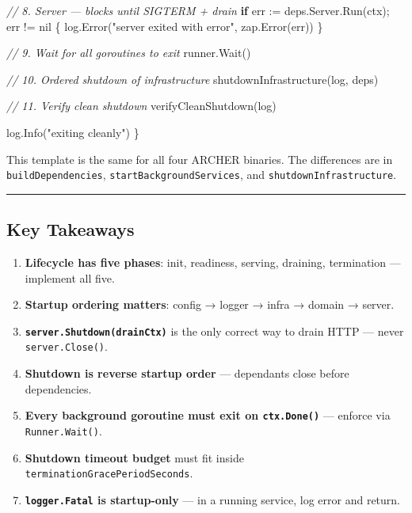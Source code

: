 \documentclass[
]{article}
\newenvironment{Shaded}{}{}
\newcommand{\CommentTok}[1]{\textcolor[rgb]{0.38,0.63,0.69}{\textit{#1}}}
\newcommand{\ControlFlowTok}[1]{\textcolor[rgb]{0.00,0.44,0.13}{\textbf{#1}}}
\newcommand{\NormalTok}[1]{#1}
\newcommand{\OperatorTok}[1]{\textcolor[rgb]{0.40,0.40,0.40}{#1}}
\newcommand{\OtherTok}[1]{\textcolor[rgb]{0.00,0.44,0.13}{#1}}
\newcommand{\StringTok}[1]{\textcolor[rgb]{0.25,0.44,0.63}{#1}}
\providecommand{\tightlist}{%
  \setlength{\itemsep}{0pt}\setlength{\parskip}{0pt}}
\begin{document}
\begin{Shaded}
\begin{Highlighting}[]
    \CommentTok{// 8. Server — blocks until SIGTERM + drain}
    \ControlFlowTok{if}\NormalTok{ err }\OperatorTok{:=}\NormalTok{ deps}\OperatorTok{.}\NormalTok{Server}\OperatorTok{.}\NormalTok{Run}\OperatorTok{(}\NormalTok{ctx}\OperatorTok{);}\NormalTok{ err }\OperatorTok{!=} \OtherTok{nil} \OperatorTok{\{}
\NormalTok{        log}\OperatorTok{.}\NormalTok{Error}\OperatorTok{(}\StringTok{"server exited with error"}\OperatorTok{,}\NormalTok{ zap}\OperatorTok{.}\NormalTok{Error}\OperatorTok{(}\NormalTok{err}\OperatorTok{))}
    \OperatorTok{\}}

    \CommentTok{// 9. Wait for all goroutines to exit}
\NormalTok{    runner}\OperatorTok{.}\NormalTok{Wait}\OperatorTok{()}

    \CommentTok{// 10. Ordered shutdown of infrastructure}
\NormalTok{    shutdownInfrastructure}\OperatorTok{(}\NormalTok{log}\OperatorTok{,}\NormalTok{ deps}\OperatorTok{)}

    \CommentTok{// 11. Verify clean shutdown}
\NormalTok{    verifyCleanShutdown}\OperatorTok{(}\NormalTok{log}\OperatorTok{)}

\NormalTok{    log}\OperatorTok{.}\NormalTok{Info}\OperatorTok{(}\StringTok{"exiting cleanly"}\OperatorTok{)}
\OperatorTok{\}}
\end{Highlighting}
\end{Shaded}

This template is the same for all four ARCHER binaries. The differences
are in \texttt{buildDependencies}, \texttt{startBackgroundServices}, and
\texttt{shutdownInfrastructure}.

\begin{center}\rule{0.5\linewidth}{0.5pt}\end{center}

\hypertarget{key-takeaways-2}{%
\subsection{Key Takeaways}\label{key-takeaways-2}}

\begin{enumerate}
\def\labelenumi{\arabic{enumi}.}
\tightlist
\item
  \textbf{Lifecycle has five phases}: init, readiness, serving,
  draining, termination --- implement all five.
\item
  \textbf{Startup ordering matters}: config → logger → infra → domain →
  server.
\item
  \textbf{\texttt{server.Shutdown(drainCtx)}} is the only correct way to
  drain HTTP --- never \texttt{server.Close()}.
\item
  \textbf{Shutdown is reverse startup order} --- dependants close before
  dependencies.
\item
  \textbf{Every background goroutine must exit on \texttt{ctx.Done()}}
  --- enforce via \texttt{Runner.Wait()}.
\item
  \textbf{Shutdown timeout budget} must fit inside
  \texttt{terminationGracePeriodSeconds}.
\item
  \textbf{\texttt{logger.Fatal} is startup-only} --- in a running
  service, log error and return.
\end{enumerate}
\end{document}
